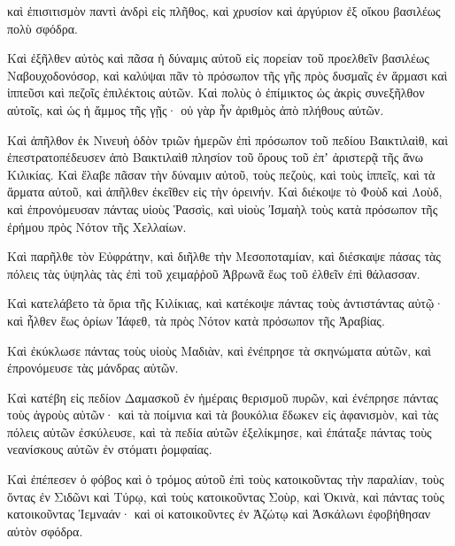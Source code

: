 {καὶ ἐπισιτισμὸν παντὶ ἀνδρὶ εἰς πλῆθος, καὶ χρυσίον καὶ ἀργύριον ἐξ οἴκου βασιλέως πολὺ σφόδρα.
\par }{\PP {}Καὶ ἐξῆλθεν αὐτὸς καὶ πᾶσα ἡ δύναμις αὐτοῦ εἰς πορείαν τοῦ προελθεῖν βασιλέως Ναβουχοδονόσορ, καὶ καλύψαι πᾶν τὸ πρόσωπον τῆς γῆς πρὸς δυσμαῖς ἐν ἅρμασι καὶ ἱππεῦσι καὶ πεζοῖς ἐπιλέκτοις αὐτῶν.
Καὶ πολὺς ὁ ἐπίμικτος ὡς ἀκρὶς συνεξῆλθον αὐτοῖς, καὶ ὡς ἡ ἄμμος τῆς γῇς· οὐ γὰρ ἦν ἀριθμὸς ἀπὸ πλήθους αὐτῶν.
\par }{\PP {}Καὶ ἀπῆλθον ἐκ Νινευὴ ὁδὸν τριῶν ἡμερῶν ἐπὶ πρόσωπον τοῦ πεδίου Βαικτιλαὶθ, καὶ ἐπεστρατοπέδευσεν ἀπὸ Βαικτιλαὶθ πλησίον τοῦ ὄρους τοῦ ἐπʼ ἀριστερᾷ τῆς ἄνω Κιλικίας.
Καὶ ἔλαβε πᾶσαν τὴν δύναμιν αὐτοῦ, τοὺς πεζοὺς, καὶ τοὺς ἱππεῖς, καὶ τὰ ἅρματα αὐτοῦ, καὶ ἀπῆλθεν ἐκεῖθεν εἰς τὴν ὀρεινήν.
Καὶ διέκοψε τὸ Φοὺδ καὶ Λοὺδ, καὶ ἐπρονόμευσαν πάντας υἱοὺς Ῥασσὶς, καὶ υἱοὺς Ἰσμαὴλ τοὺς κατὰ πρόσωπον τῆς ἐρήμου πρὸς Νότον τῆς Χελλαίων.
\par }{\PP {}Καὶ παρῆλθε τὸν Εὐφράτην, καὶ διῆλθε τὴν Μεσοποταμίαν, καὶ διέσκαψε πάσας τὰς πόλεις τὰς ὑψηλὰς τὰς ἐπὶ τοῦ χειμαῤῥοῦ Ἀβρωνᾶ ἕως τοῦ ἐλθεῖν ἐπὶ θάλασσαν.
\par }{\PP {}Καὶ κατελάβετο τὰ ὅρια τῆς Κιλίκιας, καὶ κατέκοψε πάντας τοὺς ἀντιστάντας αὐτῷ· καὶ ἦλθεν ἕως ὁρίων Ἰάφεθ, τὰ πρὸς Νότον κατὰ πρόσωπον τῆς Ἀραβίας.
\par }{\PP {}Καὶ ἐκύκλωσε πάντας τοὺς υἱοὺς Μαδιὰν, καὶ ἐνέπρησε τὰ σκηνώματα αὐτῶν, καὶ ἐπρονόμευσε τὰς μάνδρας αὐτῶν.
\par }{\PP {}Καὶ κατέβη εἰς πεδίον Δαμασκοῦ ἐν ἡμέραις θερισμοῦ πυρῶν, καὶ ἐνέπρησε πάντας τοὺς ἀγροὺς αὐτῶν· καὶ τὰ ποίμνια καὶ τὰ βουκόλια ἔδωκεν εἰς ἀφανισμὸν, καὶ τὰς πόλεις αὐτῶν ἐσκύλευσε, καὶ τὰ πεδία αὐτῶν ἐξελίκμησε, καὶ ἐπάταξε πάντας τοὺς νεανίσκους αὐτῶν ἐν στόματι ῥομφαίας.
\par }{\PP {}Καὶ ἐπέπεσεν ὁ φόβος καὶ ὁ τρόμος αὐτοῦ ἐπὶ τοὺς κατοικοῦντας τὴν παραλίαν, τοὺς ὄντας ἐν Σιδῶνι καὶ Τύρῳ, καὶ τοὺς κατοικοῦντας Σοὺρ, καὶ Ὀκινὰ, καὶ πάντας τοὺς κατοικοῦντας Ἱεμναάν· καὶ οἱ κατοικοῦντες ἐν Ἀζώτῳ καὶ Ἀσκάλωνι ἐφοβήθησαν αὐτὸν σφόδρα.

}
